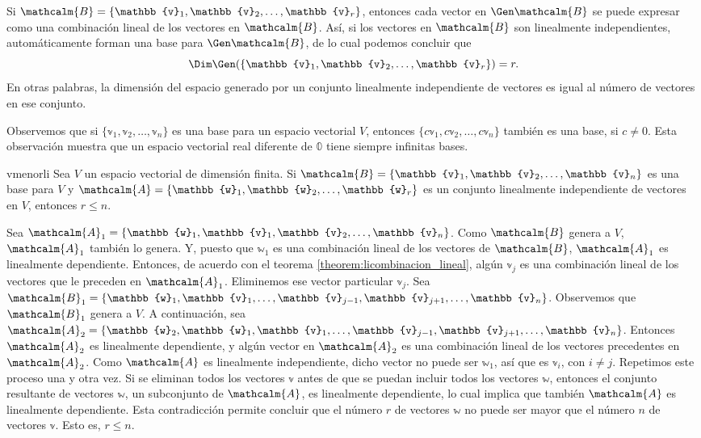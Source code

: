 \begin{examplebox}{}{}
    Si $\mathcalm{B} = \{\mathbb{v}_1, \mathbb{v}_2, \dots, \mathbb{v}_r\}$, entonces cada vector en $\Gen \mathcalm{B}$ se puede expresar como una combinación lineal de los vectores en $\mathcalm{B}$. Así, si los vectores en $\mathcalm{B}$ son linealmente independientes, automáticamente forman una base para $\Gen \mathcalm{B}$, de lo cual podemos concluir que
    $$\Dim \Gen(\{\mathbb{v}_1, \mathbb{v}_2, \dots, \mathbb{v}_r\}) = r.$$
    En otras palabras, la dimensión del espacio generado por un conjunto linealmente independiente de vectores es igual al número de vectores en ese conjunto.
\end{examplebox}

\newpage

Observemos que si $\{ \mathbb{v}_1, \mathbb{v}_2, \dots, \mathbb{v}_n \}$ es una base para un espacio vectorial $V$, entonces $\{ c\mathbb{v}_1, c\mathbb{v}_2, \dots, c\mathbb{v}_n \}$ también es una base, si $c \neq 0$. Esta observación muestra que un espacio vectorial real diferente de $\mathbb{0}$ tiene siempre infinitas bases.

\begin{theorem}{}{vmenorli}
    Sea $V$ un espacio vectorial de dimensión finita. Si $\mathcalm{B} = \{\mathbb{v}_1, \mathbb{v}_2, \dots, \mathbb{v}_n\}$ es una base para $V$ y $\mathcalm{A} = \{\mathbb{w}_1, \mathbb{w}_2, \dots, \mathbb{w}_r\}$ es un conjunto linealmente independiente de vectores en $V$, entonces $r \leq n$.

    \tcblower
    \demostracion Sea $\mathcalm{A}_1 = \{\mathbb{w}_1, \mathbb{v}_1, \mathbb{v}_2, \dots, \mathbb{v}_n\}$. Como $\mathcalm{B}$ genera a $V$, $\mathcalm{A}_1$ también lo genera. Y, puesto que $\mathbb{w}_1$ es una combinación lineal de los vectores de $\mathcalm{B}$, $\mathcalm{A}_1$ es linealmente dependiente. Entonces, de acuerdo con el teorema \ref{theorem:licombinacion_lineal}, algún $\mathbb{v}_j$ es una combinación lineal de los vectores que le preceden en $\mathcalm{A}_1$. Eliminemos ese vector particular $\mathbb{v}_j$. Sea $\mathcalm{B}_1 = \{\mathbb{w}_1, \mathbb{v}_1, \dots, \mathbb{v}_{j-1}, \mathbb{v}_{j+1}, \dots, \mathbb{v}_n\}$. Observemos que $\mathcalm{B}_1$ genera a $V$. A continuación, sea $\mathcalm{A}_2 = \{\mathbb{w}_2, \mathbb{w}_1, \mathbb{v}_1, \dots, \mathbb{v}_{j-1}, \mathbb{v}_{j+1}, \dots, \mathbb{v}_n\}$. Entonces $\mathcalm{A}_2$ es linealmente dependiente, y algún vector en $\mathcalm{A}_2$ es una combinación lineal de los vectores precedentes en $\mathcalm{A}_2$. Como $\mathcalm{A}$ es linealmente independiente, dicho vector no puede ser $\mathbb{w}_1$, así que es $\mathbb{v}_i$, con $i \neq j$. Repetimos este proceso una y otra vez. Si se eliminan todos los vectores $\mathbb{v}$ antes de que se puedan incluir todos los vectores $\mathbb{w}$, entonces el conjunto resultante de vectores $\mathbb{w}$, un subconjunto de $\mathcalm{A}$, es linealmente dependiente, lo cual implica que también $\mathcalm{A}$ es linealmente dependiente. Esta contradicción permite concluir que el número $r$ de vectores $\mathbb{w}$ no puede ser mayor que el número $n$ de vectores $\mathbb{v}$. Esto es, $r \leq n$.
\end{theorem}

